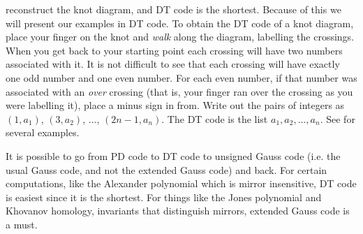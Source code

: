 \documentclass{article}
\theoremstyle{plain}
\begin{document}
        reconstruct the knot diagram, and DT code is the shortest. Because of
        this we will present our examples in DT code. To obtain the DT code of
        a knot diagram, place your finger on the knot and \textit{walk} along
        the diagram, labelling the crossings. When you get back to your starting
        point each crossing will have two numbers associated with it. It is
        not difficult to see that each crossing will have exactly one odd number
        and one even number. For each even number, if that number was associated
        with an \textit{over} crossing (that is, your finger ran over the
        crossing as you were labelling it), place a minus sign in from. Write
        out the pairs of integers as $(1,a_{1})$, $(3,a_{2})$, $\dots$,
        $(2n-1,a_{n})$. The DT code is the list $a_{1},a_{2},\dots,a_{n}$.
        See \cite{KatlasDTCode} for several examples.
        \par\hfill\par
        It is possible to go from PD code to DT code to unsigned
        Gauss code (i.e. the usual Gauss code, and not the extended Gauss code)
        and back. For certain computations, like the Alexander polynomial which
        is mirror insensitive, DT code is easiest since it is the shortest.
        For things like the Jones polynomial and Khovanov homology, invariants
        that distinguish mirrors, extended Gauss code is a must.
\end{document}
